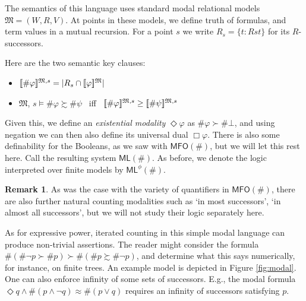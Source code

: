\documentclass[12pt,oneside,reqno]{amsart}
\newcommand{\semantics}[1]{[\![\mbox{\em $ #1 $\/}]\!]}
\theoremstyle{definition}
\newtheorem{remark}{Remark}
\begin{document}
The semantics of this language uses standard modal relational models $\mathfrak{M} = (W, R, V)$. At points in these models, we define truth of formulas, and term values in a mutual recursion. For a point $s$ we write $R_s = \{t: Rst\}$ for its  $R$-successors. 

Here are the two semantic key clauses: \vspace{.1in} 
\begin{itemize}
\item $\semantics{\#\varphi}^{\mathfrak{M}, s} = | R_s \cap \semantics{\varphi}^{\mathfrak{M}} |$ \vspace{.1in}
\item $\mathfrak{M}$, $s \models \#\varphi \succsim  \#\psi $ \, iff \, 
$\semantics{\#\varphi}^{\mathfrak{M}, s}  \geq \semantics{\#\psi}^{\mathfrak{M}, s}$ \vspace{.1in}
\end{itemize}
Given this, we define an \emph{existential modality} $\Diamond\varphi$ as $\#\varphi \succ \#\bot$, 
and using negation we can then also define its universal dual $\Box\varphi$. There is also some definability for the Booleans, as we saw with $\mathsf{MFO(\#)}$, but we will let this rest here. Call the resulting system $\mathsf{ML}(\#)$. As before, we denote the logic interpreted over finite models by $\mathsf{ML}^\phi(\#)$.



\begin{remark} As was the case with the variety of quantifiers in $\mathsf{MFO(\#)}$, there are also further natural counting modalities such as `in most successors', `in almost all successors', but we will not study their logic separately here.\end{remark}



As for expressive power, iterated counting in this simple modal language can produce non-trivial assertions. The reader might consider the formula $\#(\#\neg p \succ \# p) \succ \#(\#p \succsim \#\neg p)$, and determine what this says numerically, for instance, on finite trees. An example model is depicted in Figure \ref{fig:modal}. One can also enforce infinity of some sets of successors. %
E.g., the modal formula $\Diamond q \wedge \#(p \wedge \neg q) \approx \#(p \vee q)$ requires an infinity of successors satisfying $p$.
\end{document}
